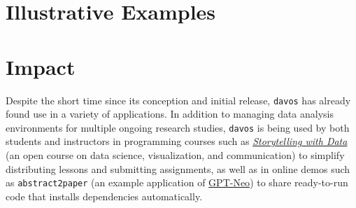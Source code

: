 \documentclass[preprint,12pt, a4paper]{elsarticle}
\begin{document}
\section{Illustrative Examples}



\section{Impact}

Despite the short time since its conception and initial release, \texttt{davos} has already found use in a variety of applications.
In addition to managing data analysis environments for multiple ongoing research studies, \texttt{davos} is being used by both students and instructors in programming courses such as \href{https://github.com/ContextLab/storytelling-with-data}{\textit{Storytelling with Data}} \cite{Mann21b} (an open course on data science, visualization, and communication) to simplify distributing lessons and submitting assignments, as well as in online demos such as {\texttt{abstract2paper}} \cite{Mann21a} (an example application of \href{https://github.com/EleutherAI/gpt-neo}{GPT-Neo}) to share ready-to-run code that installs dependencies automatically.

\end{document}
